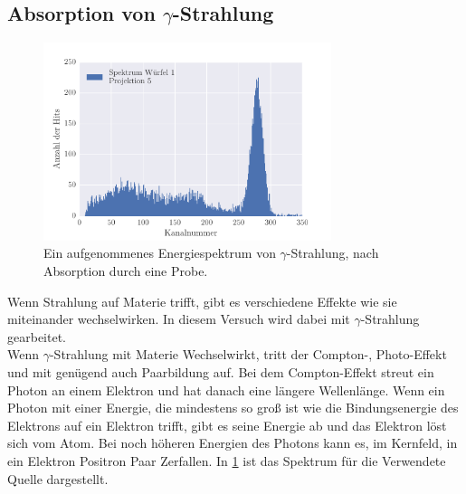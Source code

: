 \subsection{Absorption von $\gamma$-Strahlung}
\begin{figure}[h!]
	\centering
	\includegraphics[width = 0.75\textwidth]{../Grafiken/Spektrum_Block_1_Messung_5_0_350_histogram.pdf}
	\caption{Ein aufgenommenes Energiespektrum von $\gamma$-Strahlung, nach Absorption durch eine Probe.}\label{fig:EnergieSpektrum}
\end{figure}
Wenn Strahlung auf Materie trifft, gibt es verschiedene Effekte wie sie miteinander wechselwirken. 
In diesem Versuch wird dabei mit $\gamma$-Strahlung gearbeitet.\\
Wenn $\gamma$-Strahlung mit Materie Wechselwirkt, tritt der Compton-, Photo-Effekt und mit genügend auch Paarbildung auf.
Bei dem Compton-Effekt streut ein Photon an einem Elektron und hat danach eine längere Wellenlänge.
Wenn ein Photon mit einer Energie, die mindestens so groß ist wie die Bindungsenergie des Elektrons auf ein Elektron trifft, gibt es seine Energie ab und das Elektron löst sich vom Atom.
Bei noch höheren Energien des Photons kann es, im Kernfeld, in ein Elektron Positron Paar Zerfallen.
In \cref{fig:EnergieSpektrum} ist das Spektrum für die Verwendete Quelle dargestellt.  
\newpage
